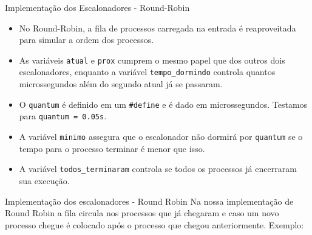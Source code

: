 \documentclass[10pt]{beamer}
\begin{document}
    \begin{frame}{Implementação dos Escalonadores - Round-Robin}
        \begin{itemize}
            \justifying
            \item No Round-Robin, a fila de processos carregada na entrada é reaproveitada para simular a ordem dos processos.

            \item As variáveis \texttt{atual} e \texttt{prox} cumprem o mesmo papel que dos outros dois escalonadores,
        enquanto a variável \texttt{tempo\_dormindo} controla quantos microssegundos além do segundo atual já se passaram.

            \item O \texttt{quantum} é definido em um \texttt{\#define} e é dado em microssegundos. Testamos para \texttt{quantum = 0.05s}.

            \item A variável \texttt{minimo} assegura que o escalonador não dormirá por \texttt{quantum} se o tempo para o processo terminar é menor que isso.

            \item A variável \texttt{todos\_terminaram} controla se todos os processos já encerraram sua execução.
        \end{itemize}
    \end{frame}
    \begin{frame}{Implementação dos escalonadores - Round Robin}
    Na nossa implementação de Round Robin a fila circula nos processos que já chegaram e caso um novo processo chegue é colocado após o processo que chegou anteriormente. Exemplo:
    \begin{figure}
    \end{figure}
    \begin{figure}
    \end{figure}
    \end{frame}
\end{document}
